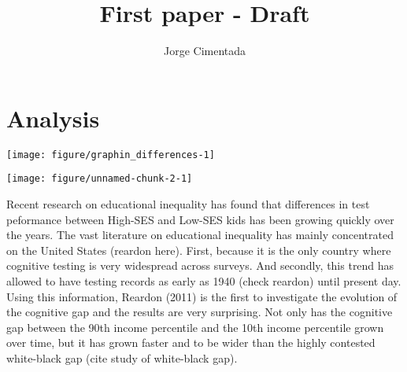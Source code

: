 \documentclass[11pt, a4paper]{article}\usepackage[]{graphicx}\usepackage[]{color}
\title{First paper - Draft}
\author{Jorge Cimentada}
\begin{document}
\setlength{\parindent}{2em}
\setlength{\parskip}{1em}

\maketitle





\tableofcontents

\section{Analysis}















{\centering \texttt{[image: figure/graphin\_differences-1]} 

}








{\centering \texttt{[image: figure/unnamed-chunk-2-1]} 

}






Recent research on educational inequality has found that differences in test peformance between High-SES and Low-SES kids has been growing quickly over the years. The vast literature on educational inequality has mainly concentrated on the United States (reardon here). First, because it is the only country where cognitive testing is very widespread across surveys. And secondly, this trend has allowed to have testing records as early as 1940 (check reardon) until present day. Using this information, Reardon (2011) is the first to investigate the evolution of the cognitive gap and the results are very surprising. Not only has the cognitive gap between the 90th income percentile and the 10th income percentile grown over time, but it has grown faster and to be wider than the highly contested white-black gap (cite study of white-black gap).
\end{document}
